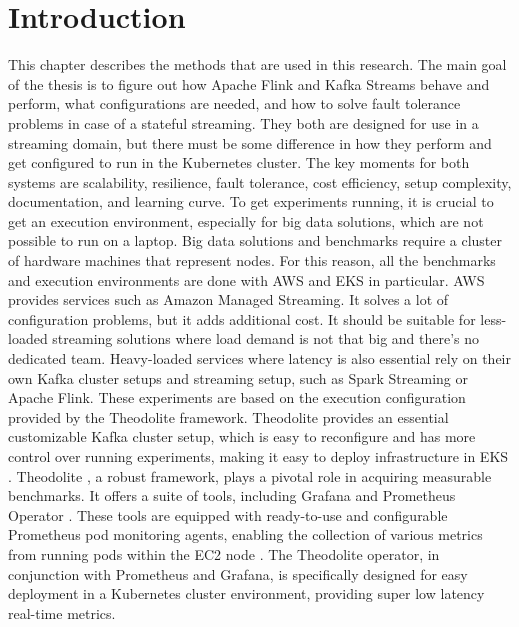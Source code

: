 \section{Introduction}\label{sec:introduction}


This chapter describes the methods that are used in this research.
The main goal of the thesis is to figure out how Apache Flink and
Kafka Streams behave and perform, what configurations are needed,
and how to solve fault tolerance problems in case of a stateful streaming.
They both are designed for use in a streaming domain, but there must
be some difference in how they perform and get configured to run in the Kubernetes cluster.
The key moments for both systems are scalability, resilience, fault tolerance,
cost efficiency, setup complexity, documentation, and learning curve.
To get experiments running, it is crucial to get an execution environment,
especially for big data solutions, which are not possible to run on a laptop.
Big data solutions and benchmarks require a cluster of hardware machines that represent nodes.
For this reason, all the benchmarks and execution environments are done with AWS and EKS in particular.
AWS provides services such as Amazon Managed Streaming.
It solves a lot of configuration problems, but it adds additional cost.
It should be suitable for less-loaded streaming solutions where load demand is not that
big and there’s no dedicated team.
Heavy-loaded services where latency is also essential rely on their own Kafka cluster setups
and streaming setup, such as Spark Streaming or Apache Flink.
These experiments are based on the execution configuration provided by the Theodolite framework.
Theodolite provides an essential customizable Kafka cluster setup,
which is easy to reconfigure and has more control over running experiments,
making it easy to deploy infrastructure in EKS \cite{AWSEKS2024}.
Theodolite \cite{theodolite_framework}, a robust framework, plays a pivotal role in acquiring measurable benchmarks.
It offers a suite of tools, including Grafana \cite{Grafana2024} and Prometheus Operator \cite{PrometheusOperator2024}.
These tools are equipped with ready-to-use and configurable Prometheus \cite{Prometheus2024} pod monitoring agents,
enabling the collection of various metrics from running pods within the EC2 node \cite{aws_node_types} \cite{EC2}.
The Theodolite operator, in conjunction with Prometheus and Grafana,
is specifically designed for easy deployment in a Kubernetes cluster environment,
providing super low latency real-time metrics.

